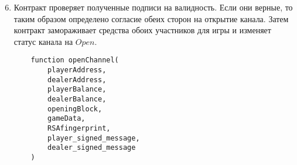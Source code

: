 \begin{algorithm}
\begin{enumerate}
\setcounter{enumi}{5}
\item Контракт проверяет полученные подписи на валидность. Если они верные, то таким образом определено согласие обеих сторон на открытие канала. Затем контракт замораживает средства обоих участников для игры и изменяет статус канала на $Open$. 
\begin{lstlisting}
    function openChannel(
        playerAddress,
        dealerAddress,
        playerBalance,
        dealerBalance,
        openingBlock,
        gameData,
        RSAfingerprint,
        player_signed_message,
        dealer_signed_message
    )
\end{lstlisting}
\end{enumerate}
\end{algorithm}



